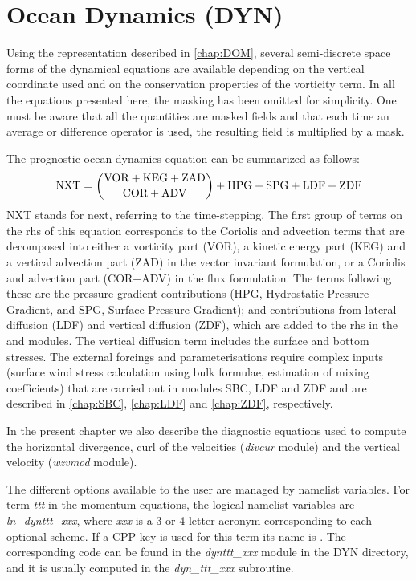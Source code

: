 \documentclass[../main/NEMO_manual]{subfiles}
\begin{document}
\chapter{Ocean Dynamics (DYN)}
\label{chap:DYN}

\minitoc

Using the representation described in \autoref{chap:DOM},
several semi-discrete space forms of the dynamical equations are available depending on
the vertical coordinate used and on the conservation properties of the vorticity term.
In all the equations presented here, the masking has been omitted for simplicity.
One must be aware that all the quantities are masked fields and
that each time an average or difference operator is used, the resulting field is multiplied by a mask.

The prognostic ocean dynamics equation can be summarized as follows:
\[
  \text{NXT} = \dbinom	{\text{VOR} + \text{KEG} + \text {ZAD} }
  {\text{COR} + \text{ADV}                       }
  + \text{HPG} + \text{SPG} + \text{LDF} + \text{ZDF}
\]
NXT stands for next, referring to the time-stepping.
The first group of terms on the rhs of this equation corresponds to the Coriolis and advection terms that
are decomposed into either a vorticity part (VOR), a kinetic energy part (KEG) and
a vertical advection part (ZAD) in the vector invariant formulation,
or a Coriolis and advection part (COR+ADV) in the flux formulation.
The terms following these are the pressure gradient contributions
(HPG, Hydrostatic Pressure Gradient, and SPG, Surface Pressure Gradient);
and contributions from lateral diffusion (LDF) and vertical diffusion (ZDF),
which are added to the rhs in the  and  modules.
The vertical diffusion term includes the surface and bottom stresses.
The external forcings and parameterisations require complex inputs
(surface wind stress calculation using bulk formulae, estimation of mixing coefficients)
that are carried out in modules SBC, LDF and ZDF and are described in
\autoref{chap:SBC}, \autoref{chap:LDF} and \autoref{chap:ZDF}, respectively. 

In the present chapter we also describe the diagnostic equations used to compute the horizontal divergence,
curl of the velocities (\emph{divcur} module) and the vertical velocity (\emph{wzvmod} module).

The different options available to the user are managed by namelist variables. 
For term \textit{ttt} in the momentum equations, the logical namelist variables are \textit{ln\_dynttt\_xxx}, 
where \textit{xxx} is a 3 or 4 letter acronym corresponding to each optional scheme.
If a CPP key is used for this term its name is .
The corresponding code can be found in the \textit{dynttt\_xxx} module in the DYN directory,
and it is usually computed in the \textit{dyn\_ttt\_xxx} subroutine.
\end{document}

